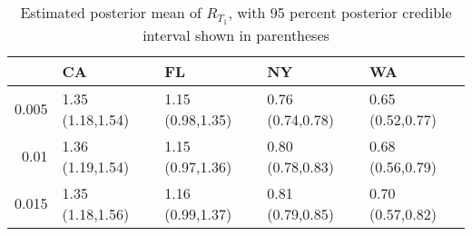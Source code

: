 \begin{table}[ht]
\centering
\begingroup\footnotesize
\begin{tabular}{rllll}
  \hline
 & CA & FL & NY & WA \\ 
  \hline
0.005 & 1.35 (1.18,1.54) & 1.15 (0.98,1.35) & 0.76 (0.74,0.78) & 0.65 (0.52,0.77) \\ 
  0.01 & 1.36 (1.19,1.54) & 1.15 (0.97,1.36) & 0.80 (0.78,0.83) & 0.68 (0.56,0.79) \\ 
  0.015 & 1.35 (1.18,1.56) & 1.16 (0.99,1.37) & 0.81 (0.79,0.85) & 0.70 (0.57,0.82) \\ 
   \hline
\end{tabular}
\endgroup
\caption{Estimated posterior mean of $R_{T_1}$, with 95 percent posterior credible interval shown in parentheses 
             \label{tab:RT1}} 
\end{table}
